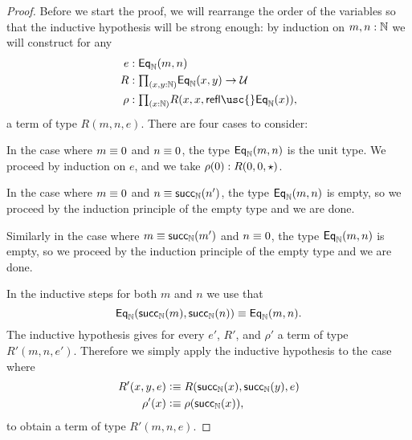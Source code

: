 \begin{proof}
  Before we start the proof, we will rearrange the order of the variables so that the inductive hypothesis will be strong enough: by induction on $m,n:\mathbb{N}$ we will construct for any
  \begin{align*}
    e & :\mathsf{Eq}_\N(m,n) \\
    R & :\prd{x,y:\N}\mathsf{Eq}_\N(x,y)\to \UU \\
    \rho & :\prd{x:\N}R(x,x,\mathsf{refl\usc{}Eq}_\N(x)),
  \end{align*}
  a term of type $R(m,n,e)$. There are four cases to consider:

  In the case where $m\equiv 0$ and $n\equiv 0$, the type $\mathsf{Eq}_\mathbb{N}(m,n)$ is the unit type. We proceed by induction on $e$, and we take $\rho(0):R(0,0,\star)$.

  In the case where $m\equiv 0$ and $n\equiv \mathsf{succ}_\mathbb{N}(n')$, the type $\mathsf{Eq}_\mathbb{N}(m,n)$ is empty, so we proceed by the induction principle of the empty type and we are done.

  Similarly in the case where $m\equiv\mathsf{succ}_\mathbb{N}(m')$ and $n\equiv 0$, the type $\mathsf{Eq}_\mathbb{N}(m,n)$ is empty, so we proceed by the induction principle of the empty type and we are done.

  In the inductive steps for both $m$ and $n$ we use that
    \begin{equation*}
      \mathsf{Eq}_\mathbb{N}(\mathsf{succ}_\mathbb{N}(m),\mathsf{succ}_\mathbb{N}(n))\equiv \mathsf{Eq}_\mathbb{N}(m,n).
    \end{equation*}
    The inductive hypothesis gives for every $e'$, $R'$, and $\rho'$ a term of type $R'(m,n,e')$. Therefore we simply apply the inductive hypothesis to the case where
    \begin{align*}
      R'(x,y,e) & \vcentcolon\equiv R(\mathsf{succ}_\mathbb{N}(x),\mathsf{succ}_\mathbb{N}(y),e) \\
      \rho'(x) & \vcentcolon\equiv \rho(\mathsf{succ}_\mathbb{N}(x)),
    \end{align*}
    to obtain a term of type $R'(m,n,e)$. 
\end{proof}

